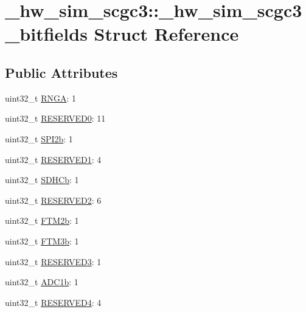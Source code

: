 \hypertarget{struct__hw__sim__scgc3_1_1__hw__sim__scgc3__bitfields}{}\section{\+\_\+hw\+\_\+sim\+\_\+scgc3\+:\+:\+\_\+hw\+\_\+sim\+\_\+scgc3\+\_\+bitfields Struct Reference}
\label{struct__hw__sim__scgc3_1_1__hw__sim__scgc3__bitfields}
\subsection*{Public Attributes}
\begin{DoxyCompactItemize}
\item 
uint32\+\_\+t \hyperlink{struct__hw__sim__scgc3_1_1__hw__sim__scgc3__bitfields_a77c37f1e90d82eb33dc7709a9fcf0a0c}{R\+N\+GA}\+: 1
\item 
uint32\+\_\+t \hyperlink{struct__hw__sim__scgc3_1_1__hw__sim__scgc3__bitfields_accabdf5691fb3af4ea12105ba30d275f}{R\+E\+S\+E\+R\+V\+E\+D0}\+: 11
\item 
uint32\+\_\+t \hyperlink{struct__hw__sim__scgc3_1_1__hw__sim__scgc3__bitfields_aa7529d4718e9bfe4efc8d9ebfdbd363d}{S\+P\+I2b}\+: 1
\item 
uint32\+\_\+t \hyperlink{struct__hw__sim__scgc3_1_1__hw__sim__scgc3__bitfields_a82c631330802e69a14f7a0b43a470252}{R\+E\+S\+E\+R\+V\+E\+D1}\+: 4
\item 
uint32\+\_\+t \hyperlink{struct__hw__sim__scgc3_1_1__hw__sim__scgc3__bitfields_a11925c8d2f766906cd379eee019dca70}{S\+D\+H\+Cb}\+: 1
\item 
uint32\+\_\+t \hyperlink{struct__hw__sim__scgc3_1_1__hw__sim__scgc3__bitfields_aed34c969dfdb25de3f9ca3700999868a}{R\+E\+S\+E\+R\+V\+E\+D2}\+: 6
\item 
uint32\+\_\+t \hyperlink{struct__hw__sim__scgc3_1_1__hw__sim__scgc3__bitfields_aa764c1ec02dc3bb89d8afff269392487}{F\+T\+M2b}\+: 1
\item 
uint32\+\_\+t \hyperlink{struct__hw__sim__scgc3_1_1__hw__sim__scgc3__bitfields_a54272b862cecc2f6198b8ba3a3e15282}{F\+T\+M3b}\+: 1
\item 
uint32\+\_\+t \hyperlink{struct__hw__sim__scgc3_1_1__hw__sim__scgc3__bitfields_ab5551b7b31f602920cb022a9c052be9b}{R\+E\+S\+E\+R\+V\+E\+D3}\+: 1
\item 
uint32\+\_\+t \hyperlink{struct__hw__sim__scgc3_1_1__hw__sim__scgc3__bitfields_ad11f44c86deacc7b01dd05d05867c52a}{A\+D\+C1b}\+: 1
\item 
uint32\+\_\+t \hyperlink{struct__hw__sim__scgc3_1_1__hw__sim__scgc3__bitfields_a9359f6aefd586a9e9d06eb19a2655d3b}{R\+E\+S\+E\+R\+V\+E\+D4}\+: 4
\end{DoxyCompactItemize}


